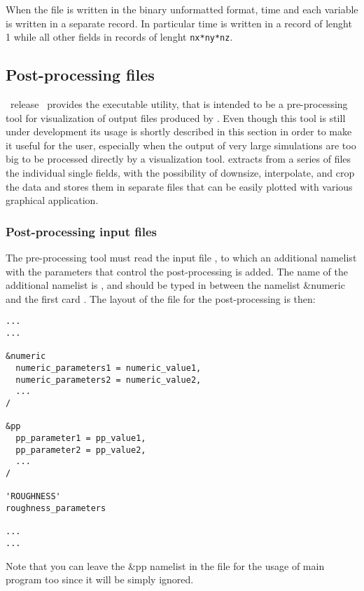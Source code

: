 When the file is written in the binary unformatted format,
time and each variable is written in a separate record.
In particular time is written in a record of lenght 1
while all other fields in records of lenght {\tt nx*ny*nz}.

\subsection{Post-processing files}
\label{sect:pp}

\PDAC\ release \PDACVERSION\ provides the executable  utility,
that is intended to be a pre-processing tool for visualization of
output files produced by \PDAC. Even though this tool is still under 
development its usage is shortly described in this section in order to make it
useful for the user, especially when the output of very large simulations
are too big to be processed directly by a visualization tool.
 extracts from a series of  files the individual single fields,
with the possibility of downsize, interpolate, and crop the data
and stores them in separate files that can be easily plotted with
various graphical application.

\subsubsection{Post-processing input files}

The pre-processing tool must read the input file , to which
an additional namelist with the parameters that control the post-processing
is added. The name of the additional namelist is , and
should be typed in between the namelist \&numeric and the first card
 . The layout of the  file for the post-processing
is then:

\begin{verbatim}
...
...

&numeric
  numeric_parameters1 = numeric_value1, 
  numeric_parameters2 = numeric_value2,
  ...
/

&pp
  pp_parameter1 = pp_value1,
  pp_parameter2 = pp_value2,
  ...
/

'ROUGHNESS'
roughness_parameters

...
...
\end{verbatim}

Note that you can leave the \&pp namelist in the  file
for the usage of main program too since it will be simply ignored.

